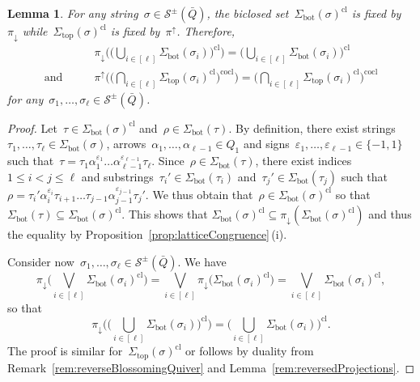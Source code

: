 \documentclass{memo-l}
\newtheorem{lemma}[theorem]{Lemma}
\theoremstyle{definition}
\newcommand{\strings}{\mathcal{S}} %
\renewcommand{\top}{\mathrm{top}} %
\newcommand{\bottom}{\mathrm{bot}} %
\newcommand{\bigJoin}{\bigvee} %
\newcommand{\closure}[1]{#1^{\mathrm{cl}}} %
\newcommand{\coclosure}[1]{#1^{\mathrm{cocl}}} %
\newcommand{\projDown}{\pi_\downarrow} %
\newcommand{\projUp}{\pi^\uparrow} %
\begin{document}
\begin{lemma}
\label{lem:fixProjDown}
For any string~$\sigma \in \strings^\pm(\bar Q)$, the biclosed set~$\closure{\Sigma_\bottom(\sigma)}$ is fixed by~$\projDown$ while~$\closure{\Sigma_\top(\sigma)}$ is fixed by~$\projUp$.
Therefore,
\begin{align*}
& \projDown \bigg( \closure{\Big( \bigcup_{i \in [\ell]} \Sigma_\bottom(\sigma_i) \Big)} \bigg) = \closure{\Big( \bigcup_{i \in [\ell]} \Sigma_\bottom(\sigma_i) \Big)} \\
\text{and} \qquad
& \projUp \bigg( \coclosure{\Big( \bigcap_{i \in [\ell]} \closure{\Sigma_\top(\sigma_i)} \Big)} \bigg) = \coclosure{\Big( \bigcap_{i \in [\ell]} \closure{\Sigma_\top(\sigma_i)} \Big)}
\end{align*}
for any~$\sigma_1, \dots, \sigma_\ell \in \strings^\pm(\bar Q)$.
\end{lemma}

\begin{proof}
Let~$\tau \in \closure{\Sigma_\bottom(\sigma)}$ and~$\rho \in \Sigma_\bottom(\tau)$.
By definition, there exist strings ${\tau_1, \dots, \tau_\ell \in \Sigma_\bottom(\sigma)}$, arrows~$\alpha_1, \dots, \alpha_{\ell-1} \in Q_1$ and signs~$\varepsilon_1, \dots, \varepsilon_{\ell-1} \in \{-1,1\}$ such that~$\tau = \tau_1 \alpha_1^{\varepsilon_1} \dots \alpha_{\ell-1}^{\varepsilon_{\ell-1}} \tau_\ell$.
Since~${\rho \in \Sigma_\bottom(\tau)}$, there exist indices~$1 \le i < j \le \ell$ and substrings~$\tau_i' \in \Sigma_\bottom(\tau_i)$ and~${\tau_j' \in \Sigma_\bottom(\tau_j)}$ such that ${\rho = \tau_i' \alpha_i^{\varepsilon_i} \tau_{i+1} \dots \tau_{j-1} \alpha_{j-1}^{\varepsilon_{j-1}} \tau_j'}$.
We thus obtain that~$\rho \in \closure{\Sigma_\bottom(\sigma)}$ so that~${\Sigma_\bottom(\tau) \subseteq \closure{\Sigma_\bottom(\sigma)}}$.
This shows that $\closure{\Sigma_\bottom(\sigma)} \subseteq \projDown(\closure{\Sigma_\bottom(\sigma)})$ and thus the equality by Proposition~\ref{prop:latticeCongruence}\,(i).

Consider now~$\sigma_1, \dots, \sigma_\ell \in \strings^\pm(\bar Q)$.
We have
\[
\projDown \bigg( \bigJoin_{i\in [\ell]} \closure{\Sigma_\bottom(\sigma_i)} \bigg) = \bigJoin_{i \in [\ell]} \projDown \big( \closure{\Sigma_\bottom(\sigma_i)} \big) = \bigJoin_{i \in [\ell]} \closure{\Sigma_\bottom(\sigma_i)},
\]
so that
\[
\projDown \bigg( \closure{\Big( \bigcup_{i \in [\ell]} \Sigma_\bottom(\sigma_i) \Big)} \bigg) = \closure{\Big( \bigcup_{i \in [\ell]} \Sigma_\bottom(\sigma_i) \Big)}.
\]
The proof is similar for~$\closure{\Sigma_\top(\sigma)}$ or follows by duality from Remark~\ref{rem:reverseBlossomingQuiver} and Lemma~\ref{rem:reversedProjections}.
\end{proof}
\end{document}
